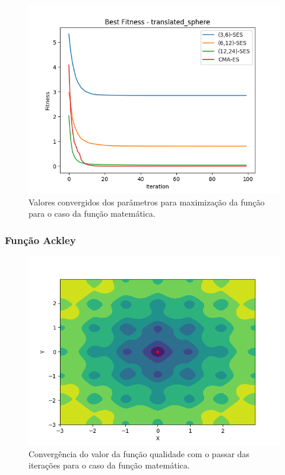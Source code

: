 \documentclass[conference]{IEEEtran}
\begin{document}
\begin{figure}[htbp]
\centering
\centerline{\includegraphics[scale=0.4]{imagens/translated_sphere/best_fitness.png}}
\caption{Valores convergidos dos parâmetros para maximização da função para o caso da função matemática.}
\label{translated_sphere/best_fitness}
\end{figure}

\subsubsection{Função Ackley}

\begin{figure}[htbp]
\centering
\centerline{\includegraphics[scale=0.4]{imagens/ackley/ses.png}}
\caption{Convergência do valor da função qualidade com o passar das iterações para o caso da função matemática.}
\label{ackley/ses}
\end{figure} 
\end{document}
